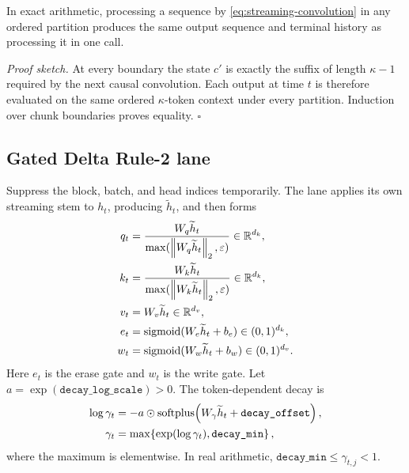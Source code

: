 \begin{proposition}
\label{prop:stem-compositionality}
In exact arithmetic, processing a sequence by
\eqref{eq:streaming-convolution} in any ordered partition produces the same
output sequence and terminal history as processing it in one call.
\end{proposition}
\noindent\emph{Proof sketch.}
At every boundary the state \(c'\) is exactly the suffix of length
\(\kappa-1\) required by the next causal convolution.  Each output at time
\(t\) is therefore evaluated on the same ordered \(\kappa\)-token context
under every partition.  Induction over chunk boundaries proves equality.
\hfill\(\square\)

\subsection{Gated Delta Rule-2 lane}
\label{subsec:gated-delta}

Suppress the block, batch, and head indices temporarily.  The lane applies its
own streaming stem to \(h_t\), producing \(\widetilde h_t\), and then forms
\begin{align}
  q_t
    &=\frac{W_q\widetilde h_t}
            {\max(\left\lVert W_q\widetilde h_t\right\rVert_2,\varepsilon)}
      \in\mathbb{R}^{d_k}, \\
  k_t
    &=\frac{W_k\widetilde h_t}
            {\max(\left\lVert W_k\widetilde h_t\right\rVert_2,\varepsilon)}
      \in\mathbb{R}^{d_k}, \\
  v_t&=W_v\widetilde h_t\in\mathbb{R}^{d_v}, \\
  e_t&=\operatorname{sigmoid}(W_e\widetilde h_t+b_e)\in(0,1)^{d_k}, \\
  w_t&=\operatorname{sigmoid}(W_w\widetilde h_t+b_w)\in(0,1)^{d_v}.
  \label{eq:gdr-projections}
\end{align}
Here \(e_t\) is the erase gate and \(w_t\) is the write gate.  Let
\(a=\exp(\texttt{decay\_log\_scale})>0\).  The token-dependent decay is
\begin{align}
  \log\gamma_t
    &=-a\odot
      \operatorname{softplus}\!\left(
        W_\gamma\widetilde h_t+\texttt{decay\_offset}
      \right), \\
  \gamma_t
    &=\max\!\left\{
        \exp(\log\gamma_t),\texttt{decay\_min}
      \right\},
  \label{eq:gdr-decay}
\end{align}
where the maximum is elementwise.  In real arithmetic,
\(\texttt{decay\_min}\leq\gamma_{t,j}<1\).

